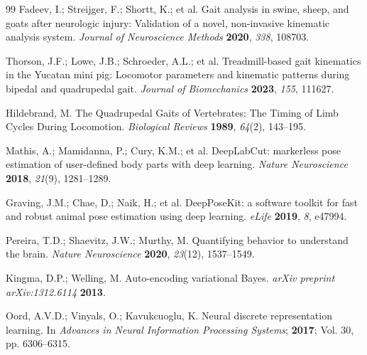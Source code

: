 \documentclass[computers,article,submit,pdftex,moreauthors]{mdpi}
\begin{document}
\begin{thebibliography}{99}
 Fadeev, I.; Streijger, F.; Shortt, K.; et al. Gait analysis in swine, sheep, and goats after neurologic injury: Validation of a novel, non-invasive kinematic analysis system. \textit{Journal of Neuroscience Methods} \textbf{2020}, \textit{338}, 108703.

 Thorson, J.F.; Lowe, J.B.; Schroeder, A.L.; et al. Treadmill-based gait kinematics in the Yucatan mini pig: Locomotor parameters and kinematic patterns during bipedal and quadrupedal gait. \textit{Journal of Biomechanics} \textbf{2023}, \textit{155}, 111627.

 Hildebrand, M. The Quadrupedal Gaits of Vertebrates: The Timing of Limb Cycles During Locomotion. \textit{Biological Reviews} \textbf{1989}, \textit{64}(2), 143--195.

 Mathis, A.; Mamidanna, P.; Cury, K.M.; et al. DeepLabCut: markerless pose estimation of user-defined body parts with deep learning. \textit{Nature Neuroscience} \textbf{2018}, \textit{21}(9), 1281--1289.

 Graving, J.M.; Chae, D.; Naik, H.; et al. DeepPoseKit: a software toolkit for fast and robust animal pose estimation using deep learning. \textit{eLife} \textbf{2019}, \textit{8}, e47994.

 Pereira, T.D.; Shaevitz, J.W.; Murthy, M. Quantifying behavior to understand the brain. \textit{Nature Neuroscience} \textbf{2020}, \textit{23}(12), 1537--1549.

 Kingma, D.P.; Welling, M. Auto-encoding variational Bayes. \textit{arXiv preprint arXiv:1312.6114} \textbf{2013}.

 Oord, A.V.D.; Vinyals, O.; Kavukcuoglu, K. Neural discrete representation learning. In \textit{Advances in Neural Information Processing Systems}; \textbf{2017}; Vol. 30, pp. 6306--6315.

\end{thebibliography}
\end{document}
